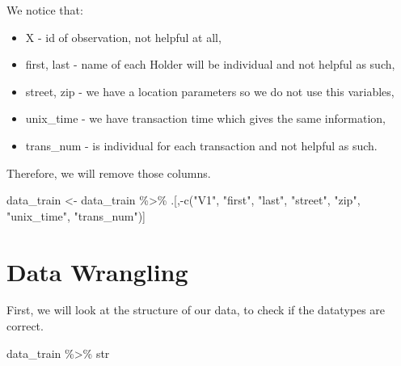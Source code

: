 \documentclass[
]{report}
\newenvironment{Shaded}{\begin{snugshade}}{\end{snugshade}}
\newcommand{\FunctionTok}[1]{\textcolor[rgb]{0.00,0.00,0.00}{#1}}
\newcommand{\NormalTok}[1]{#1}
\newcommand{\OtherTok}[1]{\textcolor[rgb]{0.56,0.35,0.01}{#1}}
\newcommand{\SpecialCharTok}[1]{\textcolor[rgb]{0.00,0.00,0.00}{#1}}
\newcommand{\StringTok}[1]{\textcolor[rgb]{0.31,0.60,0.02}{#1}}
\providecommand{\tightlist}{%
  \setlength{\itemsep}{0pt}\setlength{\parskip}{0pt}}
\begin{document}
We notice that:

\begin{itemize}
\tightlist
\item
  X - id of observation, not helpful at all,
\item
  first, last - name of each Holder will be individual and not helpful
  as such,
\item
  street, zip - we have a location parameters so we do not use this
  variables,
\item
  unix\_time - we have transaction time which gives the same
  information,
\item
  trans\_num - is individual for each transaction and not helpful as
  such.
\end{itemize}

Therefore, we will remove those columns.

\begin{Shaded}
\begin{Highlighting}[]
\NormalTok{data\_train }\OtherTok{\textless{}{-}}\NormalTok{ data\_train }\SpecialCharTok{\%\textgreater{}\%}
\NormalTok{  .[,}\SpecialCharTok{{-}}\FunctionTok{c}\NormalTok{(}\StringTok{"V1"}\NormalTok{, }\StringTok{"first"}\NormalTok{, }\StringTok{"last"}\NormalTok{, }\StringTok{"street"}\NormalTok{, }\StringTok{"zip"}\NormalTok{, }\StringTok{"unix\_time"}\NormalTok{, }\StringTok{"trans\_num"}\NormalTok{)] }
\end{Highlighting}
\end{Shaded}

\hypertarget{data-wrangling}{%
\chapter{Data Wrangling}\label{data-wrangling}}

First, we will look at the structure of our data, to check if the
datatypes are correct.

\begin{Shaded}
\begin{Highlighting}[]
\NormalTok{data\_train }\SpecialCharTok{\%\textgreater{}\%}
\NormalTok{  str}
\end{Highlighting}
\end{Shaded}
\end{document}
